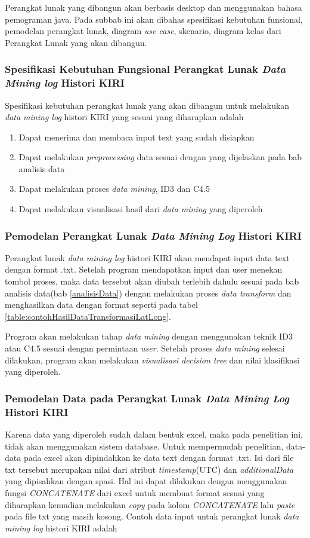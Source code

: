 Perangkat lunak yang dibangun akan berbasis desktop dan menggunakan bahasa pemograman java. Pada subbab ini akan dibahas spesifikasi kebutuhan funsional, pemodelan perangkat lunak, diagram \textsl{use case}, skenario, diagram kelas dari Perangkat Lunak yang akan dibangun.

\subsubsection{Spesifikasi Kebutuhan Fungsional Perangkat Lunak \textsl{Data Mining log} Histori KIRI}
Spesifikasi kebutuhan perangkat lunak yang akan dibangun untuk melakukan \textsl{data mining log} histori KIRI yang sesuai yang diharapkan adalah
\begin{enumerate}
	\item Dapat menerima dan membaca input text yang sudah disiapkan
	\item Dapat melakukan \textsl{preprocessing} data sesuai dengan yang dijelaskan pada bab analisis data
	\item Dapat melakukan proses \textsl{data mining}, ID3 dan C4.5
	\item Dapat melakukan visualisasi hasil dari \textsl{data mining} yang diperoleh
\end{enumerate}

\subsubsection{Pemodelan Perangkat Lunak \textsl{Data Mining Log} Histori KIRI}
Perangkat lunak \textsl{data mining log} histori KIRI akan mendapat input data text dengan format .txt. Setelah program mendapatkan input dan user menekan tombol proses, maka data tersebut akan diubah terlebih dahulu sesuai pada bab analisis data(bab \ref{analisisData}) dengan melakukan proses \textsl{data transform} dan menghasilkan data dengan format seperti pada tabel \ref{table:contohHasilDataTransformasiLatLong}.

Program akan melakukan tahap \textsl{data mining} dengan menggunakan teknik ID3 atau C4.5 sesuai dengan permintaan \textsl{user}. Setelah proses \textsl{data mining} selesai dilakukan, program akan melakukan \textsl{visualisasi decision tree} dan nilai klasifikasi yang diperoleh.  

\subsubsection{Pemodelan Data pada Perangkat Lunak \textsl{Data Mining Log} Histori KIRI}
Karena data yang diperoleh sudah dalam bentuk excel, maka pada penelitian ini, tidak akan menggunakan sistem database. Untuk mempermudah penelitian, data-data pada excel akan dipindahkan ke data text dengan format .txt. Isi dari file txt tersebut merupakan nilai dari atribut \textsl{timestamp}(UTC) dan \textsl{additionalData} yang dipisahkan dengan spasi. Hal ini dapat dilakukan dengan menggunakan fungsi \textsl{CONCATENATE} dari excel untuk membuat format sesuai yang diharapkan kemudian melakukan \textsl{copy} pada kolom \textsl{CONCATENATE} lalu \textsl{paste} pada file txt yang masih kosong. Contoh data input untuk perangkat lunak \textsl{data mining log} histori KIRI adalah

